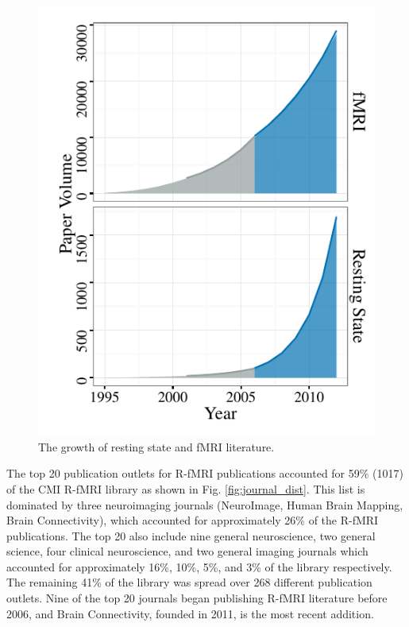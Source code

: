 \documentclass[5p]{elsarticle}
\begin{document}
\begin{figure}
  \begin{center}
    \includegraphics[]{figures/overall_growth}%
    \caption{The growth of resting state and fMRI literature.
        \label{fig:overallgrowth}
    }
  \end{center}
\end{figure}


The top 20 publication outlets for R-fMRI publications accounted for 59\%
(1017) of the CMI R-fMRI library as shown in Fig. \ref{fig:journal_dist}.
This list is dominated by three neuroimaging journals (NeuroImage, Human
Brain Mapping, Brain Connectivity), which accounted for approximately 26\%
of the R-fMRI publications. The top 20 also include nine general
neuroscience, two general science, four clinical neuroscience, and two
general imaging journals which accounted for approximately 16\%, 10\%,
5\%, and 3\% of the library respectively. The remaining 41\% of the
library was spread over 268 different publication outlets. Nine of the top
20 journals began publishing R-fMRI literature before 2006, and Brain
Connectivity, founded in 2011, is the most recent addition.  
\end{document}
